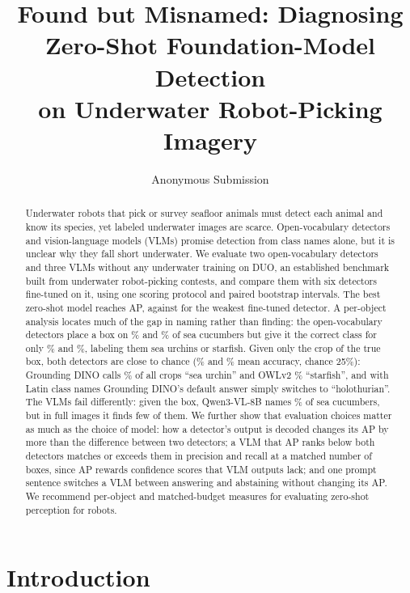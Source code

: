 \documentclass[letterpaper]{article} %
\title{Found but Misnamed: Diagnosing Zero-Shot Foundation-Model Detection\\on Underwater Robot-Picking Imagery}
\author{Anonymous Submission}
\begin{document}
\maketitle

\begin{abstract}
Underwater robots that pick or survey seafloor animals must detect each animal and know its species, yet labeled underwater images are scarce. Open-vocabulary detectors and vision-language models (VLMs) promise detection from class names alone, but it is unclear why they fall short underwater. We evaluate two open-vocabulary detectors and three VLMs without any underwater training on DUO, an established benchmark built from underwater robot-picking contests, and compare them with six detectors fine-tuned on it, using one scoring protocol and paired bootstrap intervals. The best zero-shot model reaches \apOWL{} AP, against \apYoloEightN{} for the weakest fine-tuned detector. A per-object analysis locates much of the gap in naming rather than finding: the open-vocabulary detectors place a box on \scFoundGD\% and \scFoundOWL\% of sea cucumbers but give it the correct class for only \scNamedGD\% and \scNamedOWL\%, labeling them sea urchins or starfish. Given only the crop of the true box, both detectors are close to chance (\cropOWL\% and \cropGD\% mean accuracy, chance 25\%): Grounding DINO calls \cropDefaultGD\% of all crops ``sea urchin'' and OWLv2 \cropDefaultOWL\% ``starfish'', and with Latin class names Grounding DINO's default answer simply switches to ``holothurian''. The VLMs fail differently: given the box, Qwen3-VL-8B names \cropCucQwenVL\% of sea cucumbers, but in full images it finds few of them. We further show that evaluation choices matter as much as the choice of model: how a detector's output is decoded changes its AP by more than the difference between two detectors; a VLM that AP ranks below both detectors matches or exceeds them in precision and recall at a matched number of boxes, since AP rewards confidence scores that VLM outputs lack; and one prompt sentence switches a VLM between answering and abstaining without changing its AP. We recommend per-object and matched-budget measures for evaluating zero-shot perception for robots.
\end{abstract}

\section{Introduction}
\end{document}
